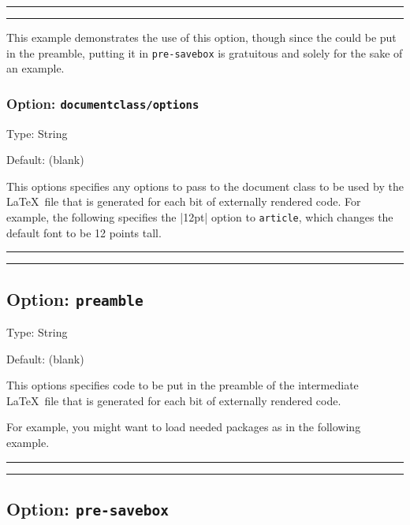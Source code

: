 \documentclass[10pt]{ltxdoc}
\newcommand{\pkg}[1]{\texttt{#1}}
\newcommand{\opt}[1]{\texttt{#1}}
\def\sz{%
  \rule{0.2em}{7pt}%
  \llap{\rule[8pt]{0.2em}{2pt}}%
}
\begin{document}
\begin{tcblisting}{}
\sz
\external[documentclass={},preamble={\documentclass{proc}}]{\pagename}%
\sz
\end{tcblisting}

This example demonstrates the use of this option, though since
the  could be put in the preamble, putting it in
\opt{pre-savebox} is gratuitous and solely for the sake of an example.

\subsubsection{Option: \opt{documentclass/options}}
\label{subsec:documentclass/options}

Type: String

Default: (blank)

This options specifies any options to pass to the document class to be
used by the \LaTeX\ file that is generated for each bit of externally
rendered code.
For example, the following specifies the |12pt| option to
\pkg{article}, which changes the default font to be 12 points tall.

\begin{tcblisting}{}
\sz{}\sz
\end{tcblisting}

\subsection{Option: \opt{preamble}}
\label{subsec:preamble}

Type: String

Default: (blank)

This options specifies code to be put in the preamble of the
intermediate \LaTeX\ file that is generated for each bit of externally
rendered code.

For example, you might want to load needed packages as in the following
example.

\begin{tcblisting}{}
\sz{}\sz
\end{tcblisting}

\subsection{Option: \opt{pre-savebox}}
\label{subsec:pre-savebox}
\end{document}
